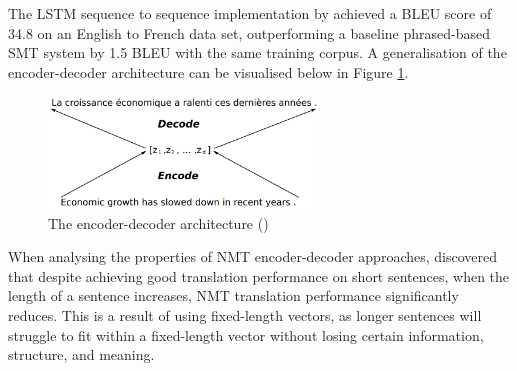 The \acrshort{LSTM} sequence to sequence implementation by \cite{sutskever_sequence_2014} achieved a \acrshort{BLEU} score of 34.8 on an English to French data set, outperforming a baseline phrased-based \acrshort{SMT} system by 1.5 \acrshort{BLEU} with the same training corpus.
A generalisation of the encoder-decoder architecture can be visualised below in Figure \ref{fig:encoder_decoder}.
\begin{figure}[ht!]
\centering
\includegraphics[width=0.64\textwidth]{media/literature/machine_translation/mt_encoder-decoder.png}
\caption[Diagram of the encoder-decoder architecture]{The encoder-decoder architecture (\cite{cho_properties_2014})}
\label{fig:encoder_decoder}
\end{figure}







When analysing the properties of \acrshort{NMT} encoder-decoder approaches, \cite{cho_properties_2014} discovered that despite achieving good translation performance on short sentences, when the length of a sentence increases, \acrshort{NMT} translation performance significantly reduces. This is a result of using fixed-length vectors, as longer sentences will struggle to fit within a fixed-length vector without losing certain information, structure, and meaning.

